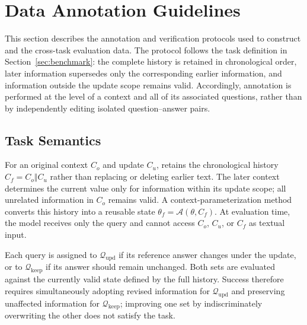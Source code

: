 \section{Data Annotation Guidelines}
\label{app:annotation-guidelines}

This section describes the annotation and verification protocols used to construct \benchmark{} and the cross-task evaluation data. The protocol follows the task definition in Section~\ref{sec:benchmark}: the complete history is retained in chronological order, later information supersedes only the corresponding earlier information, and information outside the update scope remains valid. Accordingly, annotation is performed at the level of a context and all of its associated questions, rather than by independently editing isolated question--answer pairs.

\subsection{Task Semantics}
\label{app:muse-task-semantics}

For an original context $C_o$ and update $C_u$, \task{} retains the chronological history $C_f=C_o\Vert C_u$ rather than replacing or deleting earlier text. The later context determines the current value only for information within its update scope; all unrelated information in $C_o$ remains valid. A context-parameterization method converts this history into a reusable state $\theta_f=\mathcal{A}(\theta,C_f)$. At evaluation time, the model receives only the query and cannot access $C_o$, $C_u$, or $C_f$ as textual input.

Each query is assigned to $\mathcal{Q}_{\mathrm{upd}}$ if its reference answer changes under the update, or to $\mathcal{Q}_{\mathrm{keep}}$ if its answer should remain unchanged. Both sets are evaluated against the currently valid state defined by the full history. Success therefore requires simultaneously adopting revised information for $\mathcal{Q}_{\mathrm{upd}}$ and preserving unaffected information for $\mathcal{Q}_{\mathrm{keep}}$; improving one set by indiscriminately overwriting the other does not satisfy the task.

\subsection{\benchmark{}}
\label{app:muse-annotation-guidelines}

